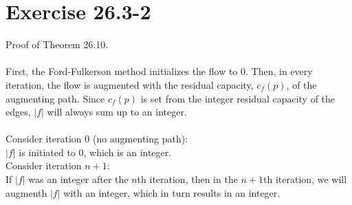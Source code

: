 \section{Exercise 26.3-2}
Proof of Theorem 26.10.
\\
\\
First, the Ford-Fulkerson method initializes the flow to 0. Then, in every iteration, the flow is augmented with the residual capacity, $c_f(p)$, of the augmenting path. Since $c_f(p)$ is set from 
the integer residual capacity of the edges, $|f|$ will always sum up to an integer.
\\
\\
Consider iteration $0$ (no augmenting path):
\\
$|f|$ is initiated to $0$, which is an integer.
\\
Consider iteration $n+1$:
\\
If $|f|$ was an integer after the $n$th iteration, then in the $n+1$th iteration, we will augmenth 
$|f|$ with an integer, which in turn results in an integer.